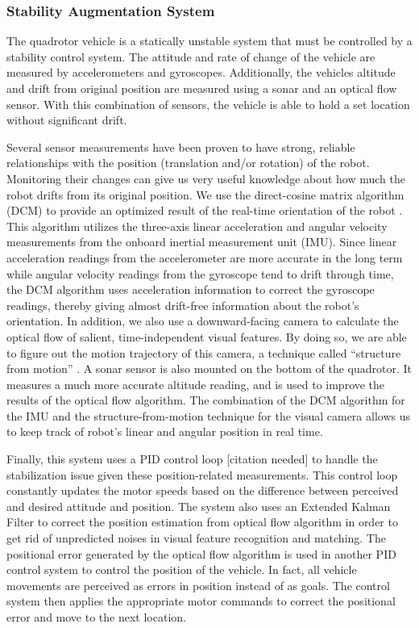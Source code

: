 \documentclass[12pt, letterpaper]{article}
\begin{document}
\subsubsection{Stability Augmentation System}

The quadrotor vehicle is a statically unstable system that must be controlled by a stability control system. The attitude and rate of change of the vehicle are measured by accelerometers and gyroscopes. Additionally, the vehicles altitude and drift from original position are measured using a sonar and an optical flow sensor. With this combination of sensors, the vehicle is able to hold a set location without significant drift.

Several sensor measurements have been proven to have strong, reliable relationships with the position (translation and/or rotation) of the robot. Monitoring their changes can give us very useful knowledge about how much the robot drifts from its original position. We use the direct-cosine matrix algorithm (DCM) to provide an optimized result of the real-time orientation of the robot . This algorithm utilizes the three-axis linear acceleration and angular velocity measurements from the onboard inertial measurement unit (IMU). Since linear acceleration readings from the accelerometer are more accurate in the long term while angular velocity readings from the gyroscope tend to drift through time, the DCM algorithm uses acceleration information to correct the gyroscope readings, thereby giving almost drift-free information about the robot's orientation. In addition, we also use a downward-facing camera to calculate the optical flow of salient, time-independent visual features. By doing so, we are able to figure out the motion trajectory of this camera, a technique called ``structure from motion'' . A sonar sensor is also mounted on the bottom of the quadrotor. It measures a much more accurate altitude reading, and is used to improve the results of the optical flow algorithm. The combination of the DCM algorithm for the IMU and the structure-from-motion technique for the visual camera allows us to keep track of robot's linear and angular position in real time.

Finally, this system uses a PID control loop [citation needed] to handle the stabilization issue given these position-related measurements. This control loop constantly updates the motor speeds based on the difference between perceived and desired attitude and position. The system also uses an Extended Kalman Filter to correct the position estimation from optical flow algorithm in order to get rid of unpredicted noises in visual feature recognition and matching. The positional error generated by the optical flow algorithm is used in another PID control system to control the position of the vehicle. In fact, all vehicle movements are perceived as errors in position instead of as goals. The control system then applies the appropriate motor commands to correct the positional error and move to the next location.
\end{document}
